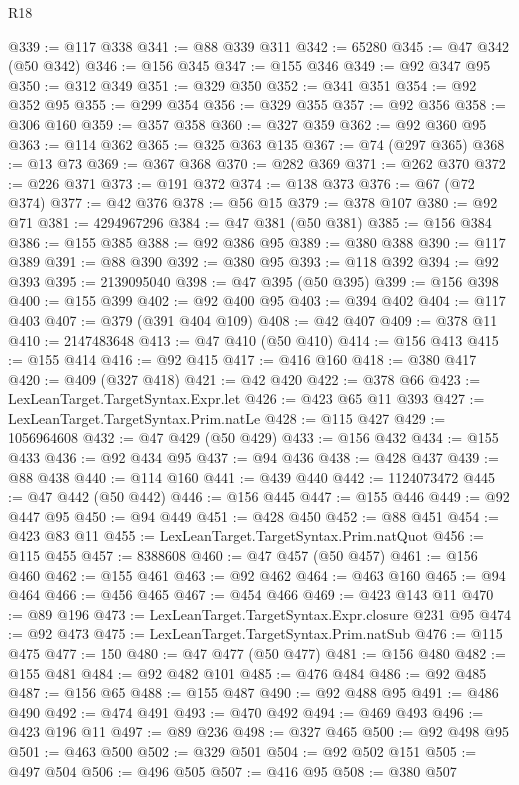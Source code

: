 \begin{lexlean}{R18}
\begin{coremodule}
@339 := @117 @338
@341 := @88 @339 @311
@342 := 65280
@345 := @47 @342 (@50 @342)
@346 := @156 @345
@347 := @155 @346
@349 := @92 @347 @95
@350 := @312 @349
@351 := @329 @350
@352 := @341 @351
@354 := @92 @352 @95
@355 := @299 @354
@356 := @329 @355
@357 := @92 @356
@358 := @306 @160
@359 := @357 @358
@360 := @327 @359
@362 := @92 @360 @95
@363 := @114 @362
@365 := @325 @363 @135
@367 := @74 (@297 @365)
@368 := @13 @73
@369 := @367 @368
@370 := @282 @369
@371 := @262 @370
@372 := @226 @371
@373 := @191 @372
@374 := @138 @373
@376 := @67 (@72 @374)
@377 := @42 @376
@378 := @56 @15
@379 := @378 @107
@380 := @92 @71
@381 := 4294967296
@384 := @47 @381 (@50 @381)
@385 := @156 @384
@386 := @155 @385
@388 := @92 @386 @95
@389 := @380 @388
@390 := @117 @389
@391 := @88 @390
@392 := @380 @95
@393 := @118 @392
@394 := @92 @393
@395 := 2139095040
@398 := @47 @395 (@50 @395)
@399 := @156 @398
@400 := @155 @399
@402 := @92 @400 @95
@403 := @394 @402
@404 := @117 @403
@407 := @379 (@391 @404 @109)
@408 := @42 @407
@409 := @378 @11
@410 := 2147483648
@413 := @47 @410 (@50 @410)
@414 := @156 @413
@415 := @155 @414
@416 := @92 @415
@417 := @416 @160
@418 := @380 @417
@420 := @409 (@327 @418)
@421 := @42 @420
@422 := @378 @66
@423 := LexLeanTarget.TargetSyntax.Expr.let
@426 := @423 @65 @11 @393
@427 := LexLeanTarget.TargetSyntax.Prim.natLe
@428 := @115 @427
@429 := 1056964608
@432 := @47 @429 (@50 @429)
@433 := @156 @432
@434 := @155 @433
@436 := @92 @434 @95
@437 := @94 @436
@438 := @428 @437
@439 := @88 @438
@440 := @114 @160
@441 := @439 @440
@442 := 1124073472
@445 := @47 @442 (@50 @442)
@446 := @156 @445
@447 := @155 @446
@449 := @92 @447 @95
@450 := @94 @449
@451 := @428 @450
@452 := @88 @451
@454 := @423 @83 @11
@455 := LexLeanTarget.TargetSyntax.Prim.natQuot
@456 := @115 @455
@457 := 8388608
@460 := @47 @457 (@50 @457)
@461 := @156 @460
@462 := @155 @461
@463 := @92 @462
@464 := @463 @160
@465 := @94 @464
@466 := @456 @465
@467 := @454 @466
@469 := @423 @143 @11
@470 := @89 @196
@473 := LexLeanTarget.TargetSyntax.Expr.closure @231 @95
@474 := @92 @473
@475 := LexLeanTarget.TargetSyntax.Prim.natSub
@476 := @115 @475
@477 := 150
@480 := @47 @477 (@50 @477)
@481 := @156 @480
@482 := @155 @481
@484 := @92 @482 @101
@485 := @476 @484
@486 := @92 @485
@487 := @156 @65
@488 := @155 @487
@490 := @92 @488 @95
@491 := @486 @490
@492 := @474 @491
@493 := @470 @492
@494 := @469 @493
@496 := @423 @196 @11
@497 := @89 @236
@498 := @327 @465
@500 := @92 @498 @95
@501 := @463 @500
@502 := @329 @501
@504 := @92 @502 @151
@505 := @497 @504
@506 := @496 @505
@507 := @416 @95
@508 := @380 @507

\end{coremodule}
\end{lexlean}
